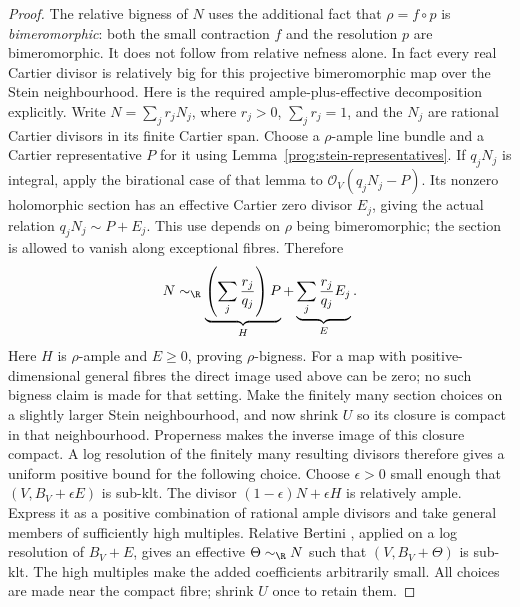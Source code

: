 \begin{proof}
The relative bigness of $N$ uses the additional fact that
$\rho=f\circ p$ is \emph{bimeromorphic}: both the small contraction
$f$ and the resolution $p$ are bimeromorphic. It does not follow from
relative nefness alone. In fact every real Cartier divisor is relatively
big for this projective bimeromorphic map over the Stein neighbourhood.
Here is the required ample-plus-effective decomposition explicitly.
Write $N=\sum_j r_jN_j$, where $r_j>0$, $\sum_jr_j=1$, and the $N_j$
are rational Cartier divisors in its finite Cartier span. Choose a
$\rho$-ample line bundle and a Cartier representative
$P$ for it using Lemma~\ref{prog:stein-representatives}.
If $q_jN_j$ is integral, apply the birational case of that lemma to
$\mathcal O_V(q_jN_j-P)$. Its nonzero holomorphic section has an
effective Cartier zero divisor $E_j$, giving the actual relation
$q_jN_j\sim P+E_j$. This use depends on $\rho$ being bimeromorphic;
the section is allowed to vanish along exceptional fibres. Therefore
\[
 N\sim_{\R}
 \underbrace{\left(\sum_j\frac{r_j}{q_j}\right)P}_{H}
 +\underbrace{\sum_j\frac{r_j}{q_j}E_j}_{E}.
\]
Here $H$ is $\rho$-ample and $E\geq0$, proving $\rho$-bigness.
For a map with positive-dimensional general fibres the direct image
used above can be zero; no such bigness claim is made for that setting.
Make the finitely many section choices on a slightly larger Stein
neighbourhood, and now shrink $U$ so its closure is compact in that
neighbourhood. Properness makes the inverse image of this closure
compact. A log resolution of the finitely many resulting divisors
therefore gives a uniform positive bound for the following choice.
Choose $\epsilon>0$ small enough that $(V,B_V+\epsilon E)$ is sub-klt.
The divisor $(1-\epsilon)N+\epsilon H$ is relatively ample. Express it
as a positive combination of rational ample divisors and take general
members of sufficiently high multiples. Relative Bertini
\cite[Theorem~2.20]{DHP}, applied on a log resolution of $B_V+E$,
gives an effective $\Theta\sim_{\R}N$ such that $(V,B_V+\Theta)$ is
sub-klt. The high multiples make the added coefficients arbitrarily
small. All choices are made near the compact fibre; shrink $U$ once
to retain them.


\end{proof}
